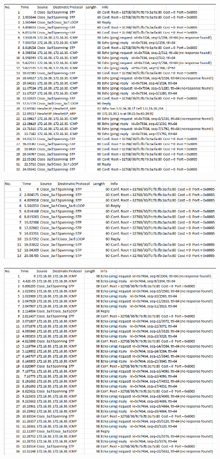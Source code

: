 \documentclass[a4paper,11pt,english]{article}
\begin{document}
        \begin{figure}[H]
            \centering
            \includegraphics[scale=0.6]{./imgs/exp2-tux34-step7.png}
        \end{figure}
        
        \begin{figure}[H]
            \centering
            \includegraphics[scale=0.6]{./imgs/exp2-tux34-step72.png}
        \end{figure}

        \begin{figure}[H]
            \centering
            \includegraphics[scale=0.6]{./imgs/exp2-tux34-step73.png}
        \end{figure}
\end{document}
